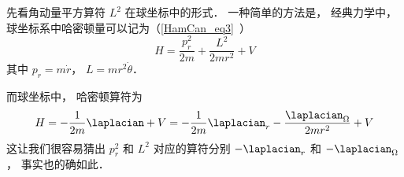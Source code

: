 

先看角动量平方算符 $L^2$ 在球坐标中的形式． 一种简单的方法是， 经典力学中， 球坐标系中哈密顿量可以记为（\autoref{HamCan_eq3}~）
\begin{equation}
H = \frac{p_r^2}{2m} + \frac{L^2}{2mr^2} + V
\end{equation}
其中 $p_r = m\dot r$， $L = mr^2\dot\theta$．

而球坐标中， 哈密顿算符为
\begin{equation}
H = -\frac{1}{2m}\laplacian + V = -\frac{1}{2m}\laplacian_r -\frac{\laplacian_\Omega}{2mr^2} + V
\end{equation}
这让我们很容易猜出 $p_r^2$ 和 $L^2$ 对应的算符分别 $-\laplacian_r$ 和 $-\laplacian_\Omega$， 事实也的确如此．
